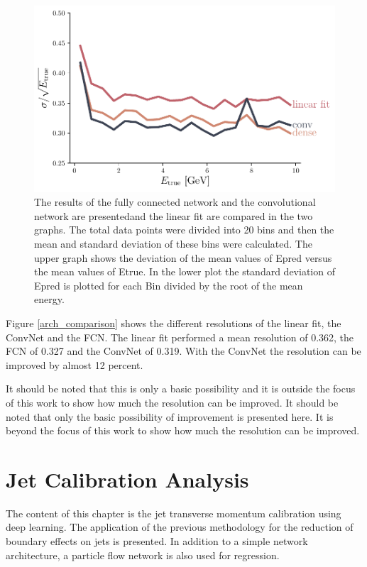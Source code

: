 \documentclass[12pt, a4paper]{thesis}
\begin{document}
\begin{figure}[htbp]
\centering
\includegraphics[width=.9\linewidth]{../images/arch_comparison.pdf}
\caption{\label{fig:org83b4caf}
The results of the fully connected network and the convolutional network are presentedand the linear fit are compared in the two graphs. The total data points were divided into 20 bins and then the mean and standard deviation of these bins were calculated. The upper graph shows the deviation of the mean values of Epred versus the mean values of Etrue. In the lower plot the standard deviation of Epred is plotted for each Bin divided by the root of the mean energy.}
\end{figure}

Figure \ref{arch_comparison} shows the different resolutions of the
linear fit, the ConvNet and the FCN. The linear fit performed a mean
resolution of 0.362, the FCN of 0.327 and the ConvNet of 0.319. With
the ConvNet the resolution can be improved by almost 12 percent.

It should be noted that this is only a basic possibility and it is
outside the focus of this work to show how much the resolution can be
improved.  It should be noted that only the basic possibility of
improvement is presented here. It is beyond the focus of this work to
show how much the resolution can be improved.

\chapter{Jet Calibration Analysis}
\label{sec:org03a9b39}

The content of this chapter is the jet transverse momentum calibration
using deep learning. The application of the previous methodology for
the reduction of boundary effects on jets is presented. In addition to
a simple network architecture, a particle flow network is also used
for regression.
\end{document}
